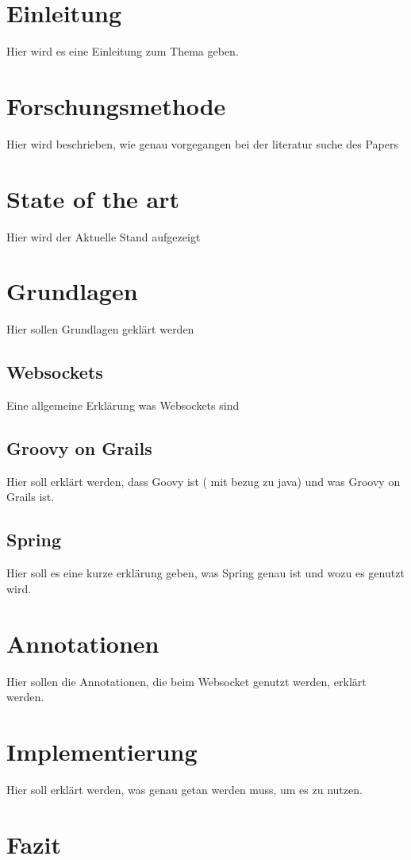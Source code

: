 \section{Einleitung}

Hier wird es eine Einleitung zum Thema geben. 

\section{Forschungsmethode}

Hier wird beschrieben, wie genau vorgegangen bei der literatur suche des Papers

\section{State of the art}

Hier wird der Aktuelle Stand aufgezeigt

\section{Grundlagen}

Hier sollen Grundlagen geklärt werden

\subsection{Websockets}

Eine allgemeine Erklärung was Websockets sind

\subsection{Groovy on Grails}

Hier soll erklärt werden, dass Goovy ist ( mit bezug zu java) und was Groovy on Grails ist.

\subsection{Spring}

Hier soll es eine kurze erklärung geben, was Spring genau ist und wozu es genutzt wird. 

\section{Annotationen}

Hier sollen die Annotationen, die beim Websocket genutzt werden, erklärt werden.

\section{Implementierung}

Hier soll erklärt werden, was genau getan werden muss, um es zu nutzen.

\section{Fazit}